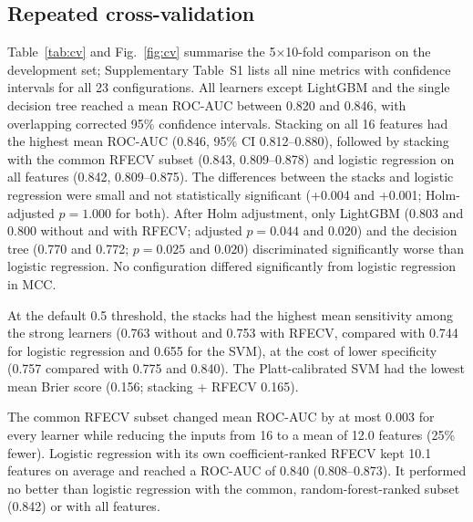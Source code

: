 \documentclass[preprint,12pt,authoryear=false]{elsarticle}
\begin{document}
\subsection{Repeated cross-validation}
Table~\ref{tab:cv} and Fig.~\ref{fig:cv} summarise the 5$\times$10-fold comparison on the development set; Supplementary Table~S1 lists all nine metrics with confidence intervals for all 23 configurations. All learners except LightGBM and the single decision tree reached a mean ROC-AUC between 0.820 and 0.846, with overlapping corrected 95\% confidence intervals. Stacking on all 16 features had the highest mean ROC-AUC (0.846, 95\% CI 0.812--0.880), followed by stacking with the common RFECV subset (0.843, 0.809--0.878) and logistic regression on all features (0.842, 0.809--0.875). The differences between the stacks and logistic regression were small and not statistically significant (+0.004 and +0.001; Holm-adjusted $p = 1.000$ for both). After Holm adjustment, only LightGBM (0.803 and 0.800 without and with RFECV; adjusted $p = 0.044$ and $0.020$) and the decision tree (0.770 and 0.772; $p = 0.025$ and $0.020$) discriminated significantly worse than logistic regression. No configuration differed significantly from logistic regression in MCC.

At the default 0.5 threshold, the stacks had the highest mean sensitivity among the strong learners (0.763 without and 0.753 with RFECV, compared with 0.744 for logistic regression and 0.655 for the SVM), at the cost of lower specificity (0.757 compared with 0.775 and 0.840). The Platt-calibrated SVM had the lowest mean Brier score (0.156; stacking + RFECV 0.165).

The common RFECV subset changed mean ROC-AUC by at most 0.003 for every learner while reducing the inputs from 16 to a mean of 12.0 features (25\% fewer). Logistic regression with its own coefficient-ranked RFECV kept 10.1 features on average and reached a ROC-AUC of 0.840 (0.808--0.873). It performed no better than logistic regression with the common, random-forest-ranked subset (0.842) or with all features.
\end{document}
